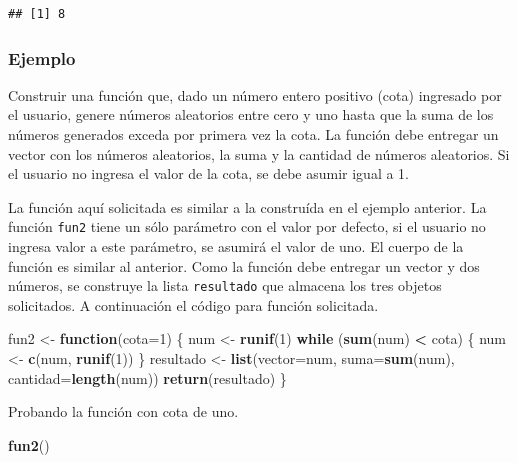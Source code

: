 \documentclass[10pt,]{krantz}
\makeatletter
\newenvironment{Shaded}{\begin{snugshade}}{\end{snugshade}}
\newcommand{\KeywordTok}[1]{\textcolor[rgb]{0.13,0.29,0.53}{\textbf{#1}}}
\newcommand{\DataTypeTok}[1]{\textcolor[rgb]{0.13,0.29,0.53}{#1}}
\newcommand{\DecValTok}[1]{\textcolor[rgb]{0.00,0.00,0.81}{#1}}
\newcommand{\StringTok}[1]{\textcolor[rgb]{0.31,0.60,0.02}{#1}}
\newcommand{\ControlFlowTok}[1]{\textcolor[rgb]{0.13,0.29,0.53}{\textbf{#1}}}
\newcommand{\OperatorTok}[1]{\textcolor[rgb]{0.81,0.36,0.00}{\textbf{#1}}}
\newcommand{\NormalTok}[1]{#1}
\newenvironment{kframe}{%
\medskip{}
\setlength{\fboxsep}{.8em}
 \def\at@end@of@kframe{}%
 \ifinner\ifhmode%
  \def\at@end@of@kframe{\end{minipage}}%
  \begin{minipage}{\columnwidth}%
 \fi\fi%
 \def\FrameCommand##1{\hskip\@totalleftmargin \hskip-\fboxsep
 \colorbox{shadecolor}{##1}\hskip-\fboxsep
     \hskip-\linewidth \hskip-\@totalleftmargin \hskip\columnwidth}%
 \MakeFramed {\advance\hsize-\width
   \@totalleftmargin\z@ \linewidth\hsize
   \@setminipage}}%
 {\par\unskip\endMakeFramed%
 \at@end@of@kframe}
\renewenvironment{Shaded}{\begin{kframe}}{\end{kframe}}
\makeatother
\begin{document}
\begin{verbatim}
## [1] 8
\end{verbatim}

\subsubsection*{Ejemplo}\label{ejemplo-7}

Construir una función que, dado un número entero positivo (cota)
ingresado por el usuario, genere números aleatorios entre cero y uno
hasta que la suma de los números generados exceda por primera vez la
cota. La función debe entregar un vector con los números aleatorios, la
suma y la cantidad de números aleatorios. Si el usuario no ingresa el
valor de la cota, se debe asumir igual a 1.

La función aquí solicitada es similar a la construída en el ejemplo
anterior. La función \texttt{fun2} tiene un sólo parámetro con el valor
por defecto, si el usuario no ingresa valor a este parámetro, se asumirá
el valor de uno. El cuerpo de la función es similar al anterior. Como la
función debe entregar un vector y dos números, se construye la lista
\texttt{resultado} que almacena los tres objetos solicitados. A
continuación el código para función solicitada.

\begin{Shaded}
\begin{Highlighting}[]
\NormalTok{fun2 <-}\StringTok{ }\ControlFlowTok{function}\NormalTok{(}\DataTypeTok{cota=}\DecValTok{1}\NormalTok{) \{}
\NormalTok{  num <-}\StringTok{ }\KeywordTok{runif}\NormalTok{(}\DecValTok{1}\NormalTok{)}
  \ControlFlowTok{while}\NormalTok{ (}\KeywordTok{sum}\NormalTok{(num) }\OperatorTok{<}\StringTok{ }\NormalTok{cota) \{}
\NormalTok{    num <-}\StringTok{ }\KeywordTok{c}\NormalTok{(num, }\KeywordTok{runif}\NormalTok{(}\DecValTok{1}\NormalTok{))}
\NormalTok{  \}}
\NormalTok{  resultado <-}\StringTok{ }\KeywordTok{list}\NormalTok{(}\DataTypeTok{vector=}\NormalTok{num,}
                    \DataTypeTok{suma=}\KeywordTok{sum}\NormalTok{(num),}
                    \DataTypeTok{cantidad=}\KeywordTok{length}\NormalTok{(num))}
  \KeywordTok{return}\NormalTok{(resultado)}
\NormalTok{\}}
\end{Highlighting}
\end{Shaded}

Probando la función con cota de uno.

\begin{Shaded}
\begin{Highlighting}[]
\KeywordTok{fun2}\NormalTok{()}
\end{Highlighting}
\end{Shaded}
\end{document}
